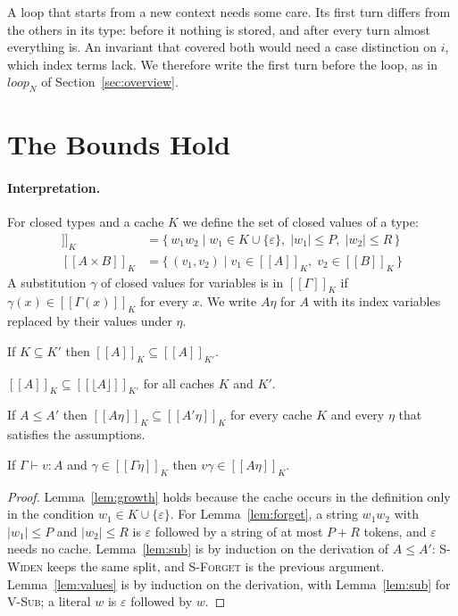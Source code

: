 \documentclass[acmsmall,nonacm,screen]{acmart}
\newcommand{\kw}[1]{\mathsf{#1}}
\newcommand{\Str}[2]{\kw{Str}[#1 \triangleright #2]}
\newcommand{\sem}[1]{[\![#1]\!]}
\newcommand{\fl}[1]{\lfloor #1 \rfloor}
\newcommand{\eps}{\varepsilon}
\newcommand{\nm}[1]{\mathit{#1}}
\begin{document}
A loop that starts from a new context needs some care. Its first turn differs from the
others in its type: before it nothing is stored, and after every turn almost everything is.
An invariant that covered both would need a case distinction on $i$, which index terms lack.
We therefore write the first turn before the loop, as in $\nm{loop}_N$ of
Section~\ref{sec:overview}.

\section{The Bounds Hold}
\label{sec:sound}

\paragraph{Interpretation.} For closed types and a cache $K$ we define the set of closed
values of a type:
\begin{align*}
\sem{\Str{P}{R}}_K &= \{\, w_1w_2 \mid w_1 \in K \cup \{\eps\},\; |w_1| \le P,\; |w_2| \le R \,\} \\
\sem{A \times B}_K &= \{\, (v_1, v_2) \mid v_1 \in \sem{A}_K,\; v_2 \in \sem{B}_K \,\}
\end{align*}
A substitution $\gamma$ of closed values for variables is in $\sem{\Gamma}_K$ if
$\gamma(x) \in \sem{\Gamma(x)}_K$ for every $x$. We write $A\eta$ for $A$ with its index
variables replaced by their values under $\eta$.

\begin{lemma}[Growth]
\label{lem:growth}
If $K \subseteq K'$ then $\sem{A}_K \subseteq \sem{A}_{K'}$.
\end{lemma}

\begin{lemma}[Forgetting]
\label{lem:forget}
$\sem{A}_K \subseteq \sem{\fl{A}}_{K'}$ for all caches $K$ and $K'$.
\end{lemma}

\begin{lemma}[Subtyping]
\label{lem:sub}
If $A \le A'$ then $\sem{A\eta}_K \subseteq \sem{A'\eta}_K$ for every cache $K$ and every
$\eta$ that satisfies the assumptions.
\end{lemma}

\begin{lemma}[Values]
\label{lem:values}
If $\Gamma \vdash v : A$ and $\gamma \in \sem{\Gamma\eta}_K$ then $v\gamma \in \sem{A\eta}_K$.
\end{lemma}

\begin{proof}
Lemma~\ref{lem:growth} holds because the cache occurs in the definition only in the condition
$w_1 \in K \cup \{\eps\}$. For Lemma~\ref{lem:forget}, a string $w_1w_2$ with $|w_1| \le P$ and
$|w_2| \le R$ is $\eps$ followed by a string of at most $P + R$ tokens, and $\eps$ needs no
cache. Lemma~\ref{lem:sub} is by induction on the derivation of $A \le A'$: \textsc{S-Widen}
keeps the same split, and \textsc{S-Forget} is the previous argument. Lemma~\ref{lem:values}
is by induction on the derivation, with Lemma~\ref{lem:sub} for \textsc{V-Sub}; a literal $w$
is $\eps$ followed by $w$.
\end{proof}
\end{document}
